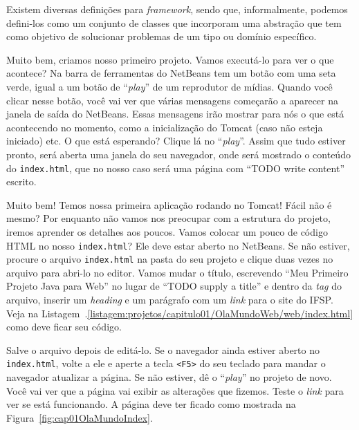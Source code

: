 \begin{saibaMais}
    Existem diversas definições para \textit{framework}, sendo que, informalmente, podemos defini-los como um conjunto de classes que incorporam uma abstração que tem como objetivo de solucionar problemas de um tipo ou domínio específico.
\end{saibaMais}

Muito bem, criamos nosso primeiro projeto. Vamos executá-lo para ver o que acontece? Na barra de ferramentas do NetBeans tem um botão com uma seta verde, igual a um botão de ``\textit{play}'' de um reprodutor de mídias. Quando você clicar nesse botão, você vai ver que várias mensagens começarão a aparecer na janela de saída do NetBeans. Essas mensagens irão mostrar para nós o que está acontecendo no momento, como a inicialização do Tomcat (caso não esteja iniciado) etc. O que está esperando? Clique lá no ``\textit{play}''. Assim que tudo estiver pronto, será aberta uma janela do seu navegador, onde será mostrado o conteúdo do \texttt{index.html}, que no nosso caso será uma página com ``TODO write content'' escrito.

Muito bem! Temos nossa primeira aplicação rodando no Tomcat! Fácil não é mesmo? Por enquanto não vamos nos preocupar com a estrutura do projeto, iremos aprender os detalhes aos poucos. Vamos colocar um pouco de código HTML no nosso \texttt{index.html}? Ele deve estar aberto no NetBeans. Se não estiver, procure o arquivo \texttt{index.html} na pasta  do seu projeto e clique duas vezes no arquivo para abri-lo no editor. Vamos mudar o título, escrevendo ``Meu Primeiro Projeto Java para Web'' no lugar de ``TODO supply a title'' e dentro da \textit{tag}  do arquivo, inserir um \textit{heading}  e um parágrafo com um \textit{link} para o site do IFSP. Veja na Listagem~\thechapter.\ref{listagem:projetos/capitulo01/OlaMundoWeb/web/index.html} como deve ficar seu código.


Salve o arquivo depois de editá-lo. Se o navegador ainda estiver aberto no \texttt{index.html}, volte a ele e aperte a tecla \texttt{<F5>} do seu teclado para mandar o navegador atualizar a página. Se não estiver, dê o ``\textit{play}'' no projeto de novo. Você vai ver que a página vai exibir as alterações que fizemos. Teste o \textit{link} para ver se está funcionando. A página deve ter ficado como mostrada na Figura~\ref{fig:cap01OlaMundoIndex}.

